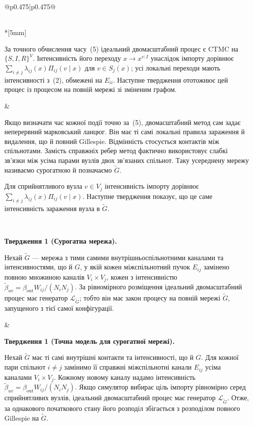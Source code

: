 \documentclass[11pt]{article}
\begin{document}
\begin{longtable}{@{}p{0.475\textwidth}|p{0.475\textwidth}@{}}
\begin{minipage}[t]{\linewidth}
\end{minipage} \\*[5mm]
\begin{minipage}[t]{\linewidth}
За точного обчислення часу~(5) ідеальний двомасштабний процес є CTMC на $\{S,I,R\}^V$. Інтенсивність його переходу $x\to x^{v:I}$ унаслідок імпорту дорівнює $\sum_{i\neq j}\lambda_{ij}(x)\Pi_{ij}(v\mid x)$ для $v\in S_j(x)$; усі локальні переходи мають інтенсивності з~(2), обмежені на $E_{ii}$. Наступне твердження ототожнює цей процес із процесом на повній мережі зі зміненим графом.
\end{minipage} &
\begin{minipage}[t]{\linewidth}
Якщо визначати час кожної події точно за~(5), двомасштабний метод сам задає неперервний марковський ланцюг. Він має ті самі локальні правила зараження й видалення, що й повний Gillespie. Відмінність стосується контактів між спільнотами. Замість справжніх ребер метод фактично використовує слабкі зв'язки між усіма парами вузлів двох зв'язаних спільнот. Таку усереднену мережу називаємо сурогатною й позначаємо $\tilde G$.
\par Для сприйнятливого вузла $v\in V_j$ інтенсивність імпорту дорівнює $\sum_{i\neq j}\lambda_{ij}(x)\Pi_{ij}(v\mid x)$. Наступне твердження показує, що це саме інтенсивність зараження вузла в $\tilde G$.
\end{minipage} \\[5mm]
\begin{minipage}[t]{\linewidth}
\par\noindent\textbf{Твердження 1 (Сурогатна мережа).}\par\noindent 
Нехай $\tilde G$ --- мережа з тими самими внутрішньоспільнотними каналами та інтенсивностями, що й $G$, у якій кожен міжспільнотний пучок $E_{ij}$ замінено повною множиною каналів $V_i\times V_j$, кожен з інтенсивністю $\tilde\beta_{uv}=\beta_{\mathrm{out}}W_{ij}/(N_iN_j)$. За рівномірного розміщення ідеальний двомасштабний процес має генератор $\mathcal{L}_{\tilde G}$; тобто він має закон процесу на повній мережі $\tilde G$, запущеного з тієї самої конфігурації.
\par
\end{minipage} &
\begin{minipage}[t]{\linewidth}
\par\noindent\textbf{Твердження 1 (Точна модель для сурогатної мережі).}\par\noindent 
Нехай $\tilde G$ має ті самі внутрішні контакти та інтенсивності, що й $G$. Для кожної пари спільнот $i\neq j$ замінимо її справжні міжспільнотні канали $E_{ij}$ усіма каналами $V_i\times V_j$. Кожному новому каналу надамо інтенсивність $\tilde\beta_{uv}=\beta_{\mathrm{out}}W_{ij}/(N_iN_j)$. Якщо симулятор вибирає ціль імпорту рівномірно серед сприйнятливих вузлів, ідеальний двомасштабний процес має генератор $\mathcal{L}_{\tilde G}$. Отже, за однакового початкового стану його розподіл збігається з розподілом повного Gillespie на $\tilde G$.

\end{minipage}
\end{longtable}
\end{document}
